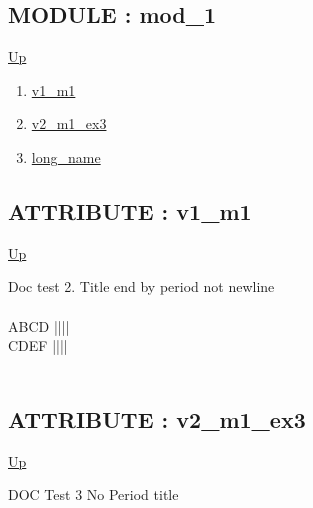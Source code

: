 \subsection*{MODULE : mod\_1}
\hypertarget{ecldoc:Example_3.mod_1}{}
\par
\begin{minipage}[t]{\textwidth}
\begin{flushleft}
  
\end{flushleft}
\end{minipage}
\hyperlink{ecldoc:Example_3}{Up} \\
\par
\par
\begin{enumerate}
\item \hyperlink{ecldoc:example_3.mod_1.v1_m1}{v1\_m1}
\item \hyperlink{ecldoc:example_3.mod_1.v2_m1_ex3}{v2\_m1\_ex3}
\item \hyperlink{ecldoc:example_3.mod_1.long_name}{long\_name}
\end{enumerate}
\subsection*{ATTRIBUTE : v1\_m1}
\hypertarget{ecldoc:example_3.mod_1.v1_m1}{}
\par
\begin{minipage}[t]{\textwidth}
\begin{flushleft}
  
\end{flushleft}
\end{minipage}
\hyperlink{ecldoc:Example_3.mod_1}{Up} \\
\par
Doc test 2. Title end by period not newline  \\
 \\
 ABCD |||| \\
 CDEF |||| \\
 \\
\par
\subsection*{ATTRIBUTE : v2\_m1\_ex3}
\hypertarget{ecldoc:example_3.mod_1.v2_m1_ex3}{}
\par
\begin{minipage}[t]{\textwidth}
\begin{flushleft}
  
\end{flushleft}
\end{minipage}
\hyperlink{ecldoc:Example_3.mod_1}{Up} \\
\par
DOC Test 3 No Period title \\
\par
